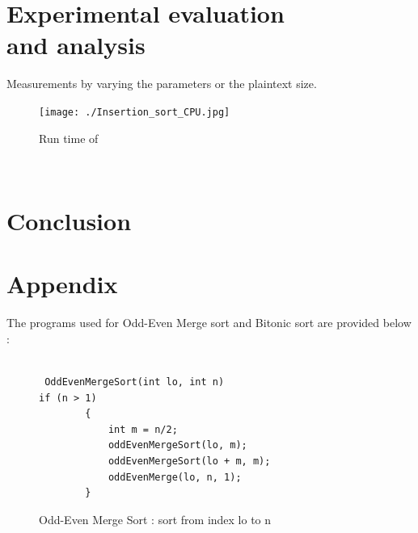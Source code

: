 \documentclass{acm_proc_article-sp}
\begin{document}
\lstset{                                    %
  language=C,
  frame=lines,
  captionpos=b
 }


\renewcommand{\lstlistingname}{Code}

\section{Experimental evaluation \\ and analysis}
\label{Sec:Eval}
Measurements by varying the parameters or the plaintext size.

\begin{figure}[!h] %
\centering
\texttt{[image: ./Insertion\_sort\_CPU.jpg]} 
\caption{Run time of } 
\label{image_f2} %
\end{figure}
\





\section{Conclusion}




  

\newpage
\section{Appendix}

 The programs used for Odd-Even Merge sort and Bitonic sort are provided below : 


\begin{figure}[h]
\begin{lstlisting}[label = oesort ]

 OddEvenMergeSort(int lo, int n)
if (n > 1)
        {
            int m = n/2;
            oddEvenMergeSort(lo, m);
            oddEvenMergeSort(lo + m, m);
            oddEvenMerge(lo, n, 1);
        }

\end{lstlisting}
\caption{Odd-Even Merge Sort : sort from index lo to n }
\end{figure}
\end{document}

